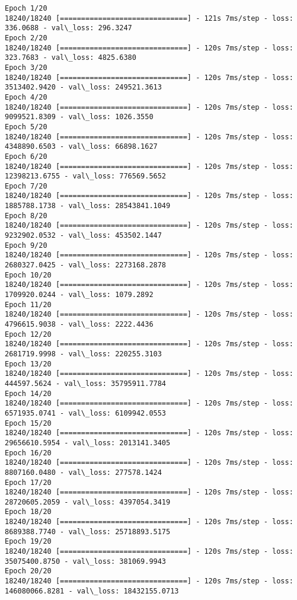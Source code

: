 \documentclass[11pt]{article}
\begin{document}
    \begin{Verbatim}[commandchars=\\\{\}]
Epoch 1/20
18240/18240 [==============================] - 121s 7ms/step - loss: 336.0688 - val\_loss: 296.3247
Epoch 2/20
18240/18240 [==============================] - 120s 7ms/step - loss: 323.7683 - val\_loss: 4825.6380
Epoch 3/20
18240/18240 [==============================] - 120s 7ms/step - loss: 3513402.9420 - val\_loss: 249521.3613
Epoch 4/20
18240/18240 [==============================] - 120s 7ms/step - loss: 9099521.8309 - val\_loss: 1026.3550
Epoch 5/20
18240/18240 [==============================] - 120s 7ms/step - loss: 4348890.6503 - val\_loss: 66898.1627
Epoch 6/20
18240/18240 [==============================] - 120s 7ms/step - loss: 12398213.6755 - val\_loss: 776569.5652
Epoch 7/20
18240/18240 [==============================] - 120s 7ms/step - loss: 1885788.1738 - val\_loss: 28543841.1049
Epoch 8/20
18240/18240 [==============================] - 120s 7ms/step - loss: 9232902.0532 - val\_loss: 453502.1447
Epoch 9/20
18240/18240 [==============================] - 120s 7ms/step - loss: 2680327.0425 - val\_loss: 2273168.2878
Epoch 10/20
18240/18240 [==============================] - 120s 7ms/step - loss: 1709920.0244 - val\_loss: 1079.2892
Epoch 11/20
18240/18240 [==============================] - 120s 7ms/step - loss: 4796615.9038 - val\_loss: 2222.4436
Epoch 12/20
18240/18240 [==============================] - 120s 7ms/step - loss: 2681719.9998 - val\_loss: 220255.3103
Epoch 13/20
18240/18240 [==============================] - 120s 7ms/step - loss: 444597.5624 - val\_loss: 35795911.7784
Epoch 14/20
18240/18240 [==============================] - 120s 7ms/step - loss: 6571935.0741 - val\_loss: 6109942.0553
Epoch 15/20
18240/18240 [==============================] - 120s 7ms/step - loss: 29656610.5954 - val\_loss: 2013141.3405
Epoch 16/20
18240/18240 [==============================] - 120s 7ms/step - loss: 8807160.0480 - val\_loss: 277578.1424
Epoch 17/20
18240/18240 [==============================] - 120s 7ms/step - loss: 28720605.2059 - val\_loss: 4397054.3419
Epoch 18/20
18240/18240 [==============================] - 120s 7ms/step - loss: 8689388.7740 - val\_loss: 25718893.5175
Epoch 19/20
18240/18240 [==============================] - 120s 7ms/step - loss: 35075400.8750 - val\_loss: 381069.9943
Epoch 20/20
18240/18240 [==============================] - 120s 7ms/step - loss: 146080066.8281 - val\_loss: 18432155.0713

    \end{Verbatim}
\end{document}
